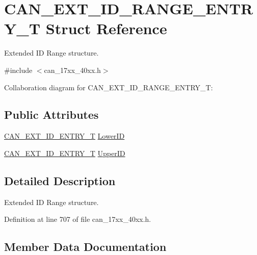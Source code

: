 \hypertarget{structCAN__EXT__ID__RANGE__ENTRY__T}{}\section{C\+A\+N\+\_\+\+E\+X\+T\+\_\+\+I\+D\+\_\+\+R\+A\+N\+G\+E\+\_\+\+E\+N\+T\+R\+Y\+\_\+T Struct Reference}
\label{structCAN__EXT__ID__RANGE__ENTRY__T}


Extended ID Range structure.  




{\ttfamily \#include $<$can\+\_\+17xx\+\_\+40xx.\+h$>$}



Collaboration diagram for C\+A\+N\+\_\+\+E\+X\+T\+\_\+\+I\+D\+\_\+\+R\+A\+N\+G\+E\+\_\+\+E\+N\+T\+R\+Y\+\_\+T\+:
\subsection*{Public Attributes}
\begin{DoxyCompactItemize}
\item 
\hyperlink{structCAN__EXT__ID__ENTRY__T}{C\+A\+N\+\_\+\+E\+X\+T\+\_\+\+I\+D\+\_\+\+E\+N\+T\+R\+Y\+\_\+T} \hyperlink{structCAN__EXT__ID__RANGE__ENTRY__T_a704cb0823b253cecdb54c0cff24f5fac}{Lower\+ID}
\item 
\hyperlink{structCAN__EXT__ID__ENTRY__T}{C\+A\+N\+\_\+\+E\+X\+T\+\_\+\+I\+D\+\_\+\+E\+N\+T\+R\+Y\+\_\+T} \hyperlink{structCAN__EXT__ID__RANGE__ENTRY__T_a6889adbc72854cce6891e7595a96bf3d}{Upper\+ID}
\end{DoxyCompactItemize}


\subsection{Detailed Description}
Extended ID Range structure. 

Definition at line 707 of file can\+\_\+17xx\+\_\+40xx.\+h.



\subsection{Member Data Documentation}
